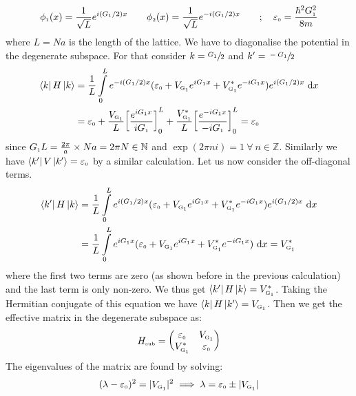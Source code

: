 \documentclass[usenames, svgnames, dvipsnames]{scrartcl}
\newcommand{\tund}[1]{_{\text{\tiny #1}}}
\begin{document}
\begin{align*}
    \phi\tund{1}(x) =\frac{1}{\sqrt{L}} e^{i(G\tund{1}/2)x} \qquad  \phi\tund{2}(x) =\frac{1}{\sqrt{L}} e^{-i(G\tund{1}/2)x}\qquad; \quad \varepsilon\tund{0} = \frac{\hbar^2 G\tund{1}^2}{8m}
\end{align*}
where $L=Na$ is the length of the lattice. We have to diagonalise the potential in the degenerate subspace. For that consider $k = \sfrac{G\tund{1}}{2}$ and $k' =\sfrac{-G\tund{1}}{2} $
\begin{align*}
    \bra{k}H \ket{k} &= \frac{1}{L} \int\limits_{0}^L e^{-i(G\tund{1}/2)x} (\varepsilon\tund{0}+ V\tund{G\textsubscript{1}} e^{iG\textsubscript{\tiny 1} x}+V\tund{G\textsubscript{1}}^* e^{-iG\textsubscript{\tiny 1} x}) e^{i(G\tund{1}/2)x}\ \dd x \\
    &=\varepsilon\tund{0} + \frac{V\tund{G\textsubscript{1}}}{L} \qty[\frac{e^{iG\tund{1}x}}{iG\tund{1}}]_0^{L}+ \frac{V\tund{G\textsubscript{1}}^*}{L} \qty[\frac{e^{-iG\tund{1}x}}{-iG\tund{1}}]_0^{L}=\varepsilon\tund{0}
\end{align*}
since $G\tund{1} L = \frac{2\pi }{a}\times Na = 2\pi N \in \mathbb{N}$ and $\exp(2\pi n i)=1 \ \forall \ n\in \mathbb{Z}$. Similarly we have $\bra{k'}V \ket{k'} = \varepsilon\tund{0}$ by a similar calculation. Let us now consider the off-diagonal terms. 
\begin{align*}
    \bra{k'}H \ket{k} &= \frac{1}{L} \int\limits_{0}^L e^{i(G\tund{1}/2)x} (\varepsilon\tund{0}+ V\tund{G\textsubscript{1}} e^{iG\textsubscript{\tiny 1} x}+V\tund{G\textsubscript{1}}^* e^{-iG\textsubscript{\tiny 1} x}) e^{i(G\tund{1}/2)x}\ \dd x \\
    &= \frac{1}{L} \int\limits_{0}^L e^{iG\tund{1}x} (\varepsilon\tund{0}+ V\tund{G\textsubscript{1}} e^{iG\textsubscript{\tiny 1} x}+V\tund{G\textsubscript{1}}^* e^{-iG\textsubscript{\tiny 1} x}) \ \dd x = V\tund{G\textsubscript{1}}^*
\end{align*}
where the first two terms are zero (as shown before in the previous calculation) and the last term is only non-zero. We thus get $ \bra{k'}H \ket{k}  = V\tund{G\textsubscript{1}}^*$. Taking the Hermitian conjugate of this equation we have $ \bra{k}H \ket{k'}  = V\tund{G\textsubscript{1}}$. Then we get the effective matrix in the degenerate subspace as:
$$H\tund{sub} = \mqty(\varepsilon\tund{0} & V\tund{G\textsubscript{1}} \\ V\tund{G\textsubscript{1}}^* & \varepsilon\tund{0})$$
The eigenvalues of the matrix are found by solving:
$$(\lambda-\varepsilon\tund{0})^2 = |V\tund{G\textsubscript{1}}|^2\implies \lambda = \varepsilon\tund{0}\pm |V\tund{G\textsubscript{1}}|$$
\end{document}
